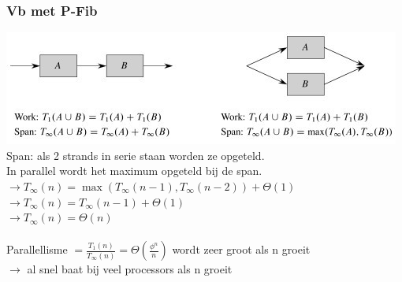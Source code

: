 \documentclass
   [kulak] %
   {kulakbeamer}
\begin{document}
\begin{frame}
	\frametitle{Vb met P-Fib}
	\includegraphics[width=\textwidth]{fig3.jpg}
	\\Span: als 2 strands in serie staan worden ze opgeteld. \\ In parallel wordt het maximum opgeteld bij de span. \pause \\
	$\rightarrow T_\infty (n) = \max(T_\infty (n-1),T_\infty (n-2)) + \Theta(1)$\\
	$\rightarrow T_\infty (n) = T_\infty (n-1) + \Theta(1)$ \\
	$\rightarrow T_\infty (n) = \Theta(n)$\\~\\
	\pause 
	Parallellisme $= \frac{T_1 (n)}{T_\infty (n)} = \Theta(\frac{\phi^n}{n})$ wordt zeer groot als n groeit \\$\rightarrow$ al snel baat bij veel processors als n groeit
	
\end{frame}
\end{document}

